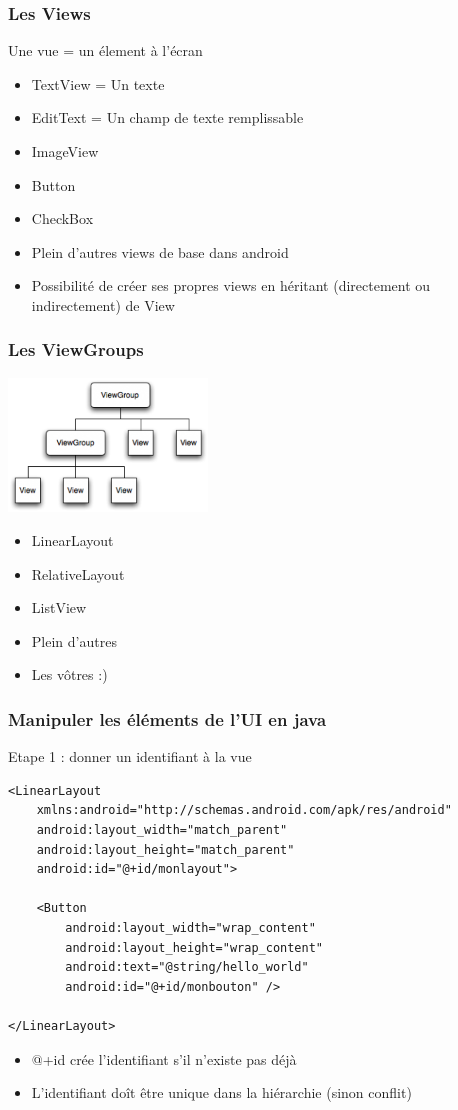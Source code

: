 \documentclass{beamer}
\begin{document}
\begin{frame}[fragile]
\frametitle{Les Views}
   Une vue = un élement à l'écran
  \begin{itemize}
    \item TextView = Un texte
    \item EditText = Un champ de texte remplissable
    \item ImageView
    \item Button
    \item CheckBox
    \item Plein d'autres views de base dans android
    \item Possibilité de créer ses propres views en héritant (directement ou
    indirectement) de View
 \end{itemize}
\end{frame}
\begin{frame}[fragile]
\frametitle{Les ViewGroups}
  \includegraphics[width=150pt]{img/viewgroup.png}
  \begin{itemize}
 \item LinearLayout
 \item RelativeLayout
 \item ListView
 \item Plein d'autres
 \item Les vôtres :)
 \end{itemize}
\end{frame}
\begin{frame}[fragile]
\frametitle{Manipuler les éléments de l'UI en java}
Etape 1 : donner un identifiant à la vue
\begin{lstlisting}
<LinearLayout 
	xmlns:android="http://schemas.android.com/apk/res/android"
    android:layout_width="match_parent"
    android:layout_height="match_parent"
    android:id="@+id/monlayout">

    <Button
        android:layout_width="wrap_content"
        android:layout_height="wrap_content"
        android:text="@string/hello_world"
        android:id="@+id/monbouton" />

</LinearLayout>
\end{lstlisting}
\begin{itemize}
    \item @+id crée l'identifiant s'il n'existe pas déjà
    \item L'identifiant doît être unique dans la hiérarchie (sinon conflit)
 \end{itemize}
\end{frame}
\end{document}
